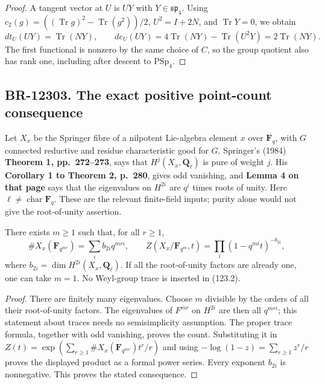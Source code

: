 \begin{proof}
A tangent vector at \(U\) is \(UY\) with
\(Y\in\mathfrak{sp}_4\). Using
\(c_2(g)=((\operatorname{Tr}g)^2-\operatorname{Tr}(g^2))/2\),
\(U^2=I+2N\), and \(\operatorname{Tr}Y=0\), we obtain
\[
 dt_U(UY)=\operatorname{Tr}(NY),\qquad
 de_U(UY)=4\operatorname{Tr}(NY)-\operatorname{Tr}(U^2Y)
          =2\operatorname{Tr}(NY).
\]
The first functional is nonzero by the same choice of
\(C\), so the group quotient also has rank one, including
after descent to \(\mathrm{PSp}_4\).
\end{proof}

\subsection{BR-12303. The exact positive point-count consequence}
Let \(X_x\) be the Springer fibre of a nilpotent Lie-algebra
element \(x\) over \(\mathbf F_q\), with \(G\) connected reductive and residue
characteristic good for \(G\). Springer's (1984)
\textbf{Theorem 1, pp.~272--273}, says that \(H^j(X_x,\mathbf Q_\ell)\)
is pure of weight \(j\). His \textbf{Corollary 1 to Theorem 2,
p.~280}, gives odd vanishing, and \textbf{Lemma 4 on that page}
says that the eigenvalues on \(H^{2i}\) are \(q^i\) times
roots of unity. Here \(\ell\ne\operatorname{char}\mathbf F_q\).
These are the relevant finite-field inputs; purity alone
would not give the root-of-unity assertion.

There exists \(m\geq1\) such that, for all \(r\geq1\),
\[
 \#X_x(\mathbf F_{q^{mr}})
       =\sum_i b_{2i}q^{mri},\qquad
 Z(X_x/\mathbf F_{q^m},t)
       =\prod_i(1-q^{mi}t)^{-b_{2i}},
 \tag{123.2}
\]
where \(b_{2i}=\dim H^{2i}(X_x,\mathbf Q_\ell)\).
If all the root-of-unity factors are already one, one
can take \(m=1\). No Weyl-group trace is inserted in (123.2).

\begin{proof}
There are finitely many eigenvalues. Choose \(m\) divisible
by the orders of all their root-of-unity factors. The
eigenvalues of \(F^{mr}\) on \(H^{2i}\) are then all
\(q^{mri}\); this statement about traces needs no
semisimplicity assumption. The proper trace formula,
together with odd vanishing, proves the count. Substituting
it in \(Z(t)=\exp(\sum_{r\geq1}\#X_x(\mathbf F_{q^{mr}})t^r/r)\)
and using \(-\log(1-z)=\sum_{r\geq1}z^r/r\) proves the
displayed product as a formal power series. Every exponent
\(b_{2i}\) is nonnegative. This proves the stated consequence.
\end{proof}

